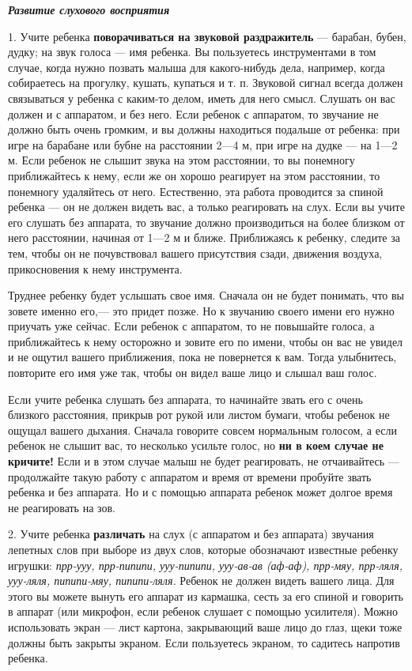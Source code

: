\documentclass{book}
\renewcommand{\emph}[1]{\textit{#1}}
\begin{document}
\emph{\textbf{Развитие слухового восприятия}}

1. Учите ребенка \textbf{поворачиваться на звуковой раздражитель} ---
барабан, бубен, дудку; на звук голоса --- имя ребенка. Вы пользуетесь
инструментами в том случае, когда нужно позвать малыша для какого-нибудь
дела, например, когда собираетесь на прогулку, кушать, купаться и т. п.
Звуковой сигнал всегда должен связываться у ребенка с каким-то делом,
иметь для него смысл. Слушать он вас должен и с аппаратом, и без него.
Если ребенок с аппаратом, то звучание не должно быть очень громким, и вы
должны находиться подальше от ребенка: при игре на барабане или бубне на
расстоянии 2---4 м, при игре на дудке --- на 1---2 м. Если ребенок не
слышит звука на этом расстоянии, то вы понемногу приближайтесь к нему,
если же он хорошо реагирует на этом расстоянии, то понемногу удаляйтесь
от него. Естественно, эта работа проводится за спиной ребенка --- он не
должен видеть вас, а только реагировать на слух. Если вы учите его
слушать без аппарата, то звучание должно производиться на более близком
от него расстоянии, начиная от 1---2 м и ближе. Приближаясь к ребенку,
следите за тем, чтобы он не почувствовал вашего присутствия сзади,
движения воздуха, прикосновения к нему инструмента.

Труднее ребенку будет услышать свое имя. Сначала он не будет понимать,
что вы зовете именно его,--- это придет позже. Но к звучанию своего
имени его нужно приучать уже сейчас. Если ребенок с аппаратом, то не
повышайте голоса, а приближайтесь к нему осторожно и зовите его по
имени, чтобы он вас не увидел и не ощутил вашего приближения, пока не
повернется к вам. Тогда улыбнитесь, повторите его имя уже так, чтобы он
видел ваше лицо и слышал ваш голос.

Если учите ребенка слушать без аппарата, то начинайте звать его с очень
близкого расстояния, прикрыв рот рукой или листом бумаги, чтобы ребенок
не ощущал вашего дыхания. Сначала говорите совсем нормальным голосом, а
если ребенок не слышит вас, то несколько усильте голос, но \textbf{ни в
коем случае не кричите!} Если и в этом случае малыш не будет
реагировать, не отчаивайтесь --- продолжайте такую работу с аппаратом и
время от времени пробуйте звать ребенка и без аппарата. Но и с помощью
аппарата ребенок может долгое время не реагировать на зов.

2. Учите ребенка \textbf{различать} на слух (с аппаратом и без аппарата)
звучания лепетных слов при выборе из двух слов, которые обозначают
известные ребенку игрушки: \emph{прр-ууу, прр-пипипи, ууу-пипипи,
ууу-ав-ав (аф-аф), прр-мяу, прр-ляля, ууу-ляля, пипипи-мяу,
пипипи-ляля.} Ребенок не должен видеть вашего лица. Для этого вы можете
вынуть его аппарат из кармашка, сесть за его спиной и говорить в аппарат
(или микрофон, если ребенок слушает с помощью усилителя). Можно
использовать экран --- лист картона, закрывающий ваше лицо до глаз, щеки
тоже должны быть закрыты экраном. Если пользуетесь экраном, то садитесь
напротив ребенка.
\end{document}
